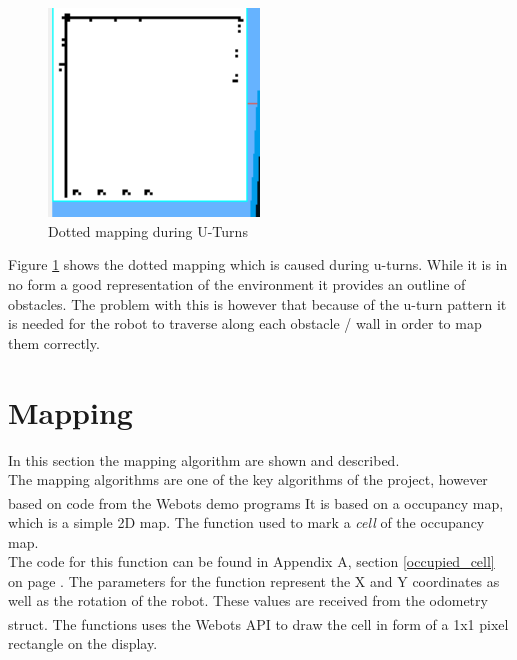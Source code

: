 \begin{figure}[h]
\centering
\includegraphics[width = 0.5\textwidth]{../../figures/map_results/dotted_uturn_mapping.png}
\caption{Dotted mapping during U-Turns}
\label{dotted_uturn}
\end{figure}

Figure \ref{dotted_uturn} shows the dotted mapping which is caused during u-turns. While it is in no form a good representation of the environment it provides an outline of obstacles. The problem with this is however that because of the u-turn pattern it is needed for the robot to traverse along each obstacle / wall in order to map them correctly.

\section{Mapping}
In this section the mapping algorithm are shown and described. \\
The mapping algorithms are one of the key algorithms of the project, however based on code from the Webots\textsuperscript{\texttrademark} demo programs It is based on a occupancy map, which is a simple 2D map. The function used to mark a \textit{cell} of the occupancy map.\\
The code for this function can be found in Appendix A, section \ref{occupied_cell} on page \pageref{occupied_cell}.
The parameters for the function represent the X and Y coordinates as well as the rotation of the robot. These values are received from the odometry struct.
The functions uses the Webots\textsuperscript{\texttrademark}  API to draw the cell in form of a 1x1 pixel rectangle on the display.

